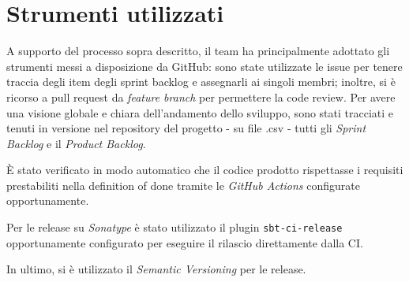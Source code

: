 \section{Strumenti utilizzati}\label{sec:strumenti-utilizzati}
A supporto del processo sopra descritto, il team ha principalmente adottato gli strumenti messi a disposizione da
GitHub: sono state utilizzate le issue per tenere traccia degli item degli sprint backlog e assegnarli ai singoli
membri;
inoltre, si è ricorso a pull request da \textit{feature branch} per permettere la code review.
Per avere una visione globale e chiara dell'andamento dello sviluppo, sono stati tracciati e tenuti in versione nel
repository del progetto - su file .csv - tutti gli \textit{Sprint Backlog} e il \textit{Product Backlog}.

È stato verificato in modo automatico che il codice prodotto rispettasse i requisiti prestabiliti nella
definition of done tramite le \textit{GitHub Actions} configurate opportunamente.

Per le release su \textit{Sonatype} è stato utilizzato il plugin \texttt{sbt-ci-release}~\cite{sbt-ci-release}
opportunamente configurato per eseguire il rilascio direttamente dalla CI\@.

In ultimo, si è utilizzato il \textit{Semantic Versioning} per le release.
